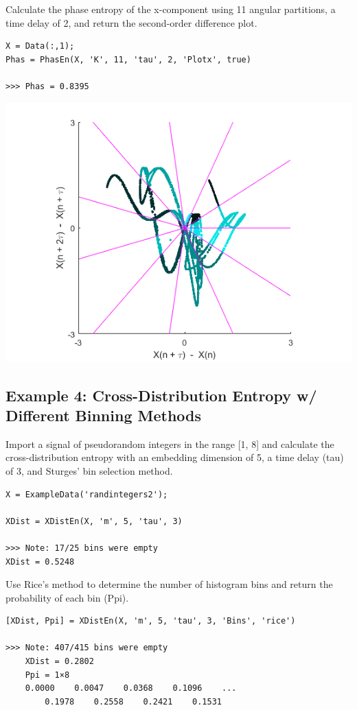 \documentclass[12pt, a4paper, titlepage, openany]{book}
\begin{document}
Calculate the phase  entropy of the x-component using 11 angular partitions, a time delay of 2, and return the second-order difference plot.
\begin{verbatim}
X = Data(:,1);
Phas = PhasEn(X, 'K', 11, 'tau', 2, 'Plotx', true)

>>> Phas = 0.8395
\end{verbatim}
\includegraphics[scale=.65]{phasex2.png}


\newpage
\subsection{\normalsize Example 4: \hspace{15mm} Cross-Distribution Entropy w/ Different Binning Methods}
\noindent Import a signal of pseudorandom integers in the range [1, 8] and calculate the cross-distribution entropy with an embedding dimension of 5, a time delay (tau) of 3, and Sturges' bin selection method.
\begin{verbatim}
X = ExampleData('randintegers2');

XDist = XDistEn(X, 'm', 5, 'tau', 3)

>>> Note: 17/25 bins were empty
XDist = 0.5248
\end{verbatim}
Use Rice's method to determine the number of histogram bins and return the probability of each bin (Ppi).
\begin{verbatim}
[XDist, Ppi] = XDistEn(X, 'm', 5, 'tau', 3, 'Bins', 'rice')

>>> Note: 407/415 bins were empty
	XDist = 0.2802
	Ppi = 1×8
    0.0000    0.0047    0.0368    0.1096    ...
    	0.1978    0.2558    0.2421    0.1531
\end{verbatim}
\end{document}
